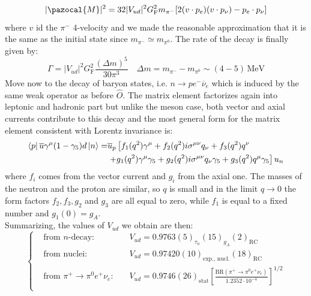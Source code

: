 \documentclass[../main.tex]{subfiles}
\begin{document}
\[
|\pazocal{M}|^2=32|V_{ud}|^2G_{\text{F}}^2m_{\pi^-}[2(v\cdot p_e)(v\cdot p_\nu)-p_e\cdot p_\nu]
\]
where $v$ id the $\pi^-$ 4-velocity and we made the reasonable approximation that it is the same as the initial state since $m_{\pi^-}\simeq m_{\pi^0}$. The rate of the decay is finally given by:
\[
\Gamma=|V_{ud}|^2G_{\text{F}}^2\frac{(\Delta m)^5}{30\pi^3} \quad \Delta m=m_{\pi^-}-m_{\pi^0}\sim (4-5)\,\text{MeV}
\]
Move now to the decay of baryon states, i.e. $n\to pe^-\overline{\nu}_e$ which is induced by the same weak operator as before $\hat{O}$. The matrix element factorizes again into leptonic and hadronic part but unlike the meson case, both vector and axial currents contribute to this decay and the most general form for the matrix element consistent with Lorentz invariance is:
\begin{align*}
\bra{p}\overline{u}\gamma^\mu(1-\gamma_5)d\ket{n}=&\overline{u}_p\left[f_1(q^2)\gamma^\mu+f_2(q^2)i\sigma^{\mu\nu}q_\nu+f_3(q^2)q^\nu\right.\\
&\left.+g_1(q^2)\gamma^\mu\gamma_5+g_2(q^2)i\sigma^{\mu\nu}q_\nu\gamma_5+g_3(q^2)q^\mu\gamma_5\right]u_n
\end{align*}
where $f_i$ comes from the vector current and $g_i$ from the axial one. The masses of the neutron and the proton are similar, so $q$ is small and in the limit $q\to0$ the form factors $f_2, f_3, g_2$ and $g_3$ are all equal to zero, while $f_1$ is equal to a fixed number and $g_1(0)=g_A$.\\
Summarizing, the values of $V_{ud}$ we obtain are then:
\[
\left\{
\begin{aligned}
&\text{from $n$-decay: }&&V_{ud}=0.9763(5)_{\tau_n}(15)_{g_A}(2)_{\text{RC}}\\
&\text{from nuclei: }&&V_{ud}=0.97420(10)_{\text{exp., nucl.}}(18)_{\text{RC}}\\
&\text{from $\pi^+\to\pi^0e^+\nu_e$: }&&V_{ud}=0.9746(26)_{\text{stat}}\left[\frac{\text{BR}(\pi^+\to\pi^0e^+\nu_e)}{1.2352\cdot10^{-4}}\right]^{1/2}\\
\end{aligned}
\right.
\]
\end{document}
